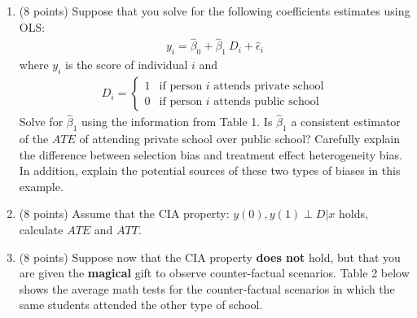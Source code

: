 \documentclass[letterpaper,12pt]{article}
\begin{document}
\begin{enumerate}[label=(\alph*)]
\item (8 points) Suppose that you solve for the following coefficients estimates using OLS:
\begin{eqnarray*}
y_i=\hat{\beta}_0+\hat{\beta}_1 \: D_i+\hat{\epsilon}_i
\end{eqnarray*}
where $y_i$ is the score of individual $i$ and 
\begin{eqnarray*}
D_i=\begin{cases}
		1 & \text{if person $i$ attends private school} \\
             0 & \text{if person $i$ attends public school} 
\end{cases}
\end{eqnarray*}	
Solve for $\hat{\beta}_1$ using the information from Table 1. Is $\hat{\beta}_1$ a consistent estimator of the $ATE$ of attending private school over public school? Carefully explain the difference between selection bias and treatment effect heterogeneity bias. In addition, explain the potential sources of these two types of biases in this example.
\item (8 points) Assume that the CIA property: $y(0),y(1) \perp D|x$ holds, calculate $ATE$ and $ATT$. 
\item (8 points) Suppose now that the CIA property \textbf{does not} hold, but that you are given the \textbf{magical} gift to observe counter-factual scenarios. Table 2 below shows the average math tests for the counter-factual scenarios in which the same students attended the other type of school.  
\begin{table}[H]
\begin{center}
\caption{\textbf{Counterfactuals} Average Score on National Math Test (out of 100)}
\label{table:main_shock_effect}
\end{center}
\end{table}
\end{enumerate}
\end{document}
